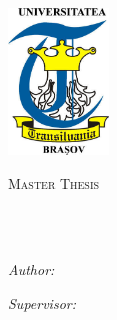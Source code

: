 \documentclass[
12pt, %
english, %
singlespacing, %
oneside,
headsepline, %
]{MastersDoctoralThesis} %
\author{Bogdan Alexandru \textsc{Lupu}} %
\begin{document}
\frontmatter %

\pagestyle{plain} %


\begin{titlepage}
\begin{center}
\includegraphics[width=0.2\textwidth]{images/unilogo.jpg}\\[0.5cm]
{\scshape\LARGE \univname\par}\vspace{1.5cm} %
\textsc{\Large Master Thesis}\\[0.5cm] %

\HRule \\[0.4cm] %
{\huge \bfseries \ttitle\par}\vspace{0.4cm} %
\HRule \\[1.5cm] %

\begin{minipage}[t]{0.4\textwidth}
\begin{flushleft} \large
\emph{Author:}\\
\authorname %
\end{flushleft}
\end{minipage}
\begin{minipage}[t]{0.4\textwidth}
\begin{flushright} \large
\emph{Supervisor:} \\
\supname %
\end{flushright}
\end{minipage}\\[3cm]


\end{center}
\end{titlepage}
\end{document}
